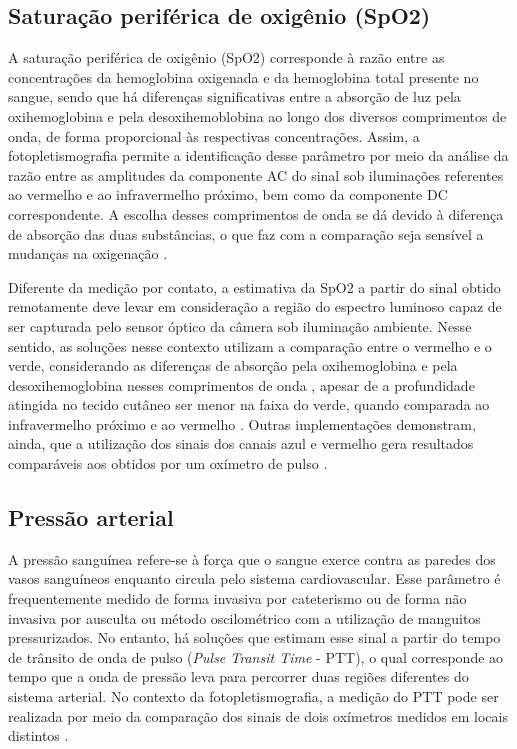 \subsection{Saturação periférica de oxigênio (SpO2)}

A saturação periférica de oxigênio (SpO2) corresponde à razão entre as concentrações da hemoglobina oxigenada e da hemoglobina total presente no sangue, sendo que há diferenças significativas entre a absorção de luz pela oxihemoglobina e pela desoxihemoblobina ao longo dos diversos comprimentos de onda, de forma proporcional às respectivas concentrações. Assim, a fotopletismografia permite a identificação desse parâmetro por meio da análise da razão entre as amplitudes da componente AC do sinal sob iluminações referentes ao vermelho e ao infravermelho próximo, bem como da componente DC correspondente. A escolha desses comprimentos de onda se dá devido à diferença de absorção das duas substâncias, o que faz com a comparação seja sensível a mudanças na oxigenação \cite{allen2007photoplethysmography}. 

Diferente da medição por contato, a estimativa da SpO2 a partir do sinal obtido remotamente deve levar em consideração a região do espectro luminoso capaz de ser capturada pelo sensor óptico da câmera sob iluminação ambiente. Nesse sentido, as soluções nesse contexto utilizam a comparação entre o vermelho e o verde, considerando as diferenças de absorção pela oxihemoglobina e pela desoxihemoglobina nesses comprimentos de onda \cite{kong2013non}, apesar de a profundidade atingida no tecido cutâneo ser menor na faixa do verde, quando comparada ao infravermelho próximo e ao vermelho \cite{mocco2021pulse}. Outras implementações demonstram, ainda, que a utilização dos sinais dos canais azul e vermelho gera resultados comparáveis aos obtidos por um oxímetro de pulso \cite{casalino2020mhealth, gs2024remote, guazzi2015non}.

\subsection{Pressão arterial}

A pressão sanguínea refere-se à força que o sangue exerce contra as paredes dos vasos sanguíneos enquanto circula pelo sistema cardiovascular. Esse parâmetro é frequentemente medido de forma invasiva por cateterismo ou de forma não invasiva por ausculta ou método oscilométrico com a utilização de manguitos pressurizados. No entanto, há soluções que estimam esse sinal a partir do tempo de trânsito de onda de pulso (\textit{Pulse Transit Time} - PTT), o qual corresponde ao tempo que a onda de pressão leva para percorrer duas regiões diferentes do sistema arterial. No contexto da fotopletismografia, a medição do PTT pode ser realizada por meio da comparação dos sinais de dois oxímetros medidos em locais distintos \cite{mukkamala2015toward}. 

